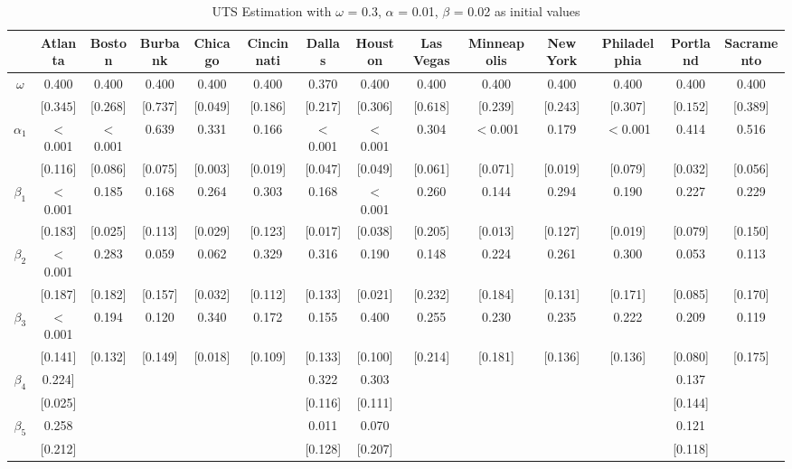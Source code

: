 \documentclass{article}
\begin{document}
	
	
	\begin{sidewaystable}[htbp]
		\centering
		\caption{UTS Estimation with $\omega$ = 0.3, $\alpha$ = 0.01, $\beta$ = 0.02 as initial values}
		\begin{tabular}{cccccccccccccc}
			\toprule
			& Atlanta & Boston & Burbank & Chicago & Cincinnati & Dallas & Houston & Las Vegas & Minneapolis & New York & Philadelphia & Portland & Sacramento \\
			\midrule
			$\omega$ & 0.400 & 0.400 & 0.400 & 0.400 & 0.400 & 0.370 & 0.400 & 0.400 & 0.400 & 0.400 & 0.400 & 0.400 &0.400\\
			& [$0.345$] & [$0.268$] & [$0.737$] & [$0.049$] & [$0.186$] & [$0.217$] & [$0.306$] & [$0.618$] & [$0.239$] & [$0.243$] & [$0.307$] & [$0.152$] & [$0.389$] \\
			$\alpha_{1}$  & $<$0.001 & $<$0.001 & 0.639 & 0.331 & 0.166 & $<$0.001 & $<$0.001 & 0.304 & $<$0.001 & 0.179 & $<$0.001 & 0.414 & 0.516 \\
			& [0.116] & [0.086] & [0.075] & [0.003] & [0.019] & [0.047] & [0.049] & [0.061] & [0.071] & [0.019] & [0.079] & [0.032] & [0.056] \\
			$\beta_{1}$ & $<$0.001 & 0.185 & 0.168 & 0.264 & 0.303 & 0.168 & $<$0.001 & 0.260 & 0.144 & 0.294 & 0.190 & 0.227 & 0.229 \\
			& [0.183] & [0.025] & [0.113] & [0.029] & [0.123] & [0.017] & [0.038] & [0.205] & [0.013] & [0.127] & [0.019] & [0.079] & [0.150] \\
			$\beta_{2}$ & $<$0.001 & 0.283 & 0.059 & 0.062 & 0.329 & 0.316 & 0.190 & 0.148 & 0.224 & 0.261 & 0.300 & 0.053 & 0.113 \\
			& [0.187] & [0.182] & [0.157] & [0.032] & [0.112] & [0.133] & [0.021] & [0.232] & [0.184] & [0.131] & [0.171] & [0.085] & [0.170] \\
			$\beta_{3}$  & $<$0.001 & 0.194 & 0.120 & 0.340 & 0.172 & 0.155 & 0.400 & 0.255 & 0.230 & 0.235 & 0.222 & 0.209 & 0.119 \\
			& [0.141] & [0.132] & [0.149] & [0.018] & [0.109] & [0.133] & [0.100] & [0.214] & [0.181] & [0.136] & [0.136] & [0.080] & [0.175] \\
			$\beta_{4}$  & 0.224] & & & & & 0.322 & 0.303 & & & & & 0.137 & \\
			& [0.025] & & & & & [0.116] & [0.111] & & & & & [0.144] & \\
			$\beta_{5}$  & 0.258 & & & & & 0.011 & 0.070 & & & & & 0.121 & \\
			& [0.212] & & & & & [0.128] & [0.207] & & & & & [0.118] & \\
			
			\bottomrule
		\end{tabular}
	\end{sidewaystable}
	
	
	
\end{document}
